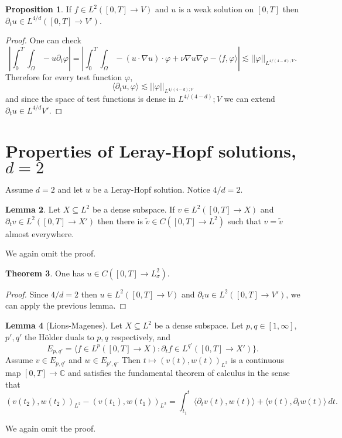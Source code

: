 \documentclass[12pt]{book}
\newcommand{\CC}{\mathbb{C}}
\theoremstyle{definition}
\newtheorem{theorem}{Theorem}[chapter]
\newtheorem{lemma}[theorem]{Lemma}
\newtheorem{proposition}[theorem]{Proposition}
\begin{document}
\begin{proposition}
If $f \in L^2([0, T] \to V)$ and $u$ is a weak solution on $[0, T]$ then $\partial_t u \in L^{4/d}([0, T] \to V')$.
\end{proposition}
\begin{proof}
One can check
$$\left|\int_0^T \int_\Omega -u\partial_t \varphi\right| = \left|\int_0^T \int_\Omega -(u \cdot \nabla u) \cdot \varphi + \nu \nabla u \nabla \varphi - \langle f, \varphi\rangle\right| \lesssim ||\varphi||_{L^{4/(4-d);V}}.$$
Therefore for every test function $\varphi$,
$$\langle \partial_t u, \varphi\rangle \lesssim ||\varphi||_{L^{4/(4-d);V}}$$
and since the space of test functions is dense in $L^{4/(4-d)};V$ we can extend $\partial_t u \in L^{4/d}V'$.
\end{proof}

\section{Properties of Leray-Hopf solutions, $d = 2$}
Assume $d = 2$ and let $u$ be a Leray-Hopf solution.
Notice $4/d = 2$.

\begin{lemma}
Let $X \subseteq L^2$ be a dense subspace.
If $v \in L^2([0, T] \to X)$ and $\partial_t v \in L^2([0, T] \to X')$ then there is $\tilde v \in C([0, T] \to L^2)$ such that $v = \tilde v$ almost everywhere.
\end{lemma}
We again omit the proof.

\begin{theorem}
One has $u \in C([0, T] \to L^2_\sigma)$.
\end{theorem}
\begin{proof}
Since $4/d = 2$ then $u \in L^2([0, T] \to V)$ and $\partial_t u \in L^2([0, T] \to V')$, we can apply the previous lemma.
\end{proof}

\begin{lemma}[Lions-Magenes]
Let $X \subseteq L^2$ be a dense subspace.
Let $p, q \in [1, \infty]$, $p',q'$ the H\"older duals to $p,q$ respectively, and
$$E_{p,q'} = \langle f \in L^p([0, T] \to X): \partial_t f \in L^{q'}([0, T] \to X')\}.$$
Assume $v \in E_{p,q'}$ and $w \in E_{p',q}$.
Then $t \mapsto (v(t), w(t))_{L^2}$ is a continuous map $[0, T] \to \CC$ and satisfies the fundamental theorem of calculus in the sense that
$$(v(t_2), w(t_2))_{L^2} - (v(t_1), w(t_1))_{L^2} = \int_{t_1}^t \langle \partial_t v(t), w(t)\rangle + \langle v(t), \partial_t w(t)\rangle ~dt.$$
\end{lemma}
We again omit the proof.
\end{document}
